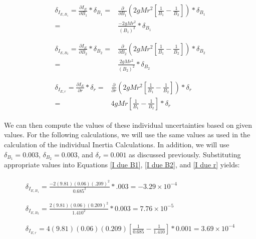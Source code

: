 \documentclass[12pt]{article}
\begin{document}
\begin{align}
    \begin{split}
        \delta_{I_{E,B_1}}= \frac{\partial I_E}{\partial B_1}*\delta_{B_1}=&\frac{\partial}{\partial B_1}(2gMr^2[\frac{1}{B_1}-\frac{1}{B_2}])*\delta_{B_1} \\
        =& \frac{-2gMr^2}{(B_1)^2}*\delta_{B_1} \label{I due B1}
    \end{split} \\ \nonumber \\
    \begin{split}
        \delta_{I_{E,B_2}}= \frac{\partial I_E}{\partial B_2}*\delta_{B_2}=&\frac{\partial}{\partial B_2}(2gMr^2[\frac{1}{B_1}-\frac{1}{B_2}])*\delta_{B_2} \\
        =& \frac{2gMr^2}{(B_2)^2}*\delta_{B_2} \label{I due B2}
    \end{split} \\ \nonumber \\
    \begin{split}
        \delta_{I_{E,r}}= \frac{\partial I_E}{\partial r}*\delta_{r}=&\frac{\partial}{\partial r}(2gMr^2[\frac{1}{B_1}-\frac{1}{B_2}])*\delta_{r} \\
        =& 4gMr[\frac{1}{B_1}-\frac{1}{B_2}]*\delta_r \label{I due r}
    \end{split}
\end{align}

\indent We can then compute the values of these individual uncertainties based on given values. For the following calculations, we will use the same values as used in the calculation of the individual Inertia Calculations. In addition, we will use $\delta_{B_1}=0.003$, $\delta_{B_2}=0.003$, and $\delta_r=0.001$ as discussed previously. Substituting appropriate values into Equations \ref{I due B1}, \ref{I due B2}, and \ref{I due r} yields:

\begin{align*}
    \begin{split}
        \delta_{I_{E,B_1}}=\frac{-2(9.81)(0.06)(.209)^2}{0.685^2}*.003=-3.29\times10^{-4}
    \end{split} \\ \\
    \begin{split}
        \delta_{I_{E,B_2}}=\frac{2(9.81)(0.06)(0.209)^2}{1.410^2}*0.003=7.76\times10^{-5}
    \end{split} \\ \\
    \begin{split}
        \delta_{I_{E,r}}=4(9.81)(0.06)(0.209)[\frac{1}{0.685}-\frac{1}{1.410}]*0.001=3.69\times10^{-4}
    \end{split}
\end{align*}
\end{document}
